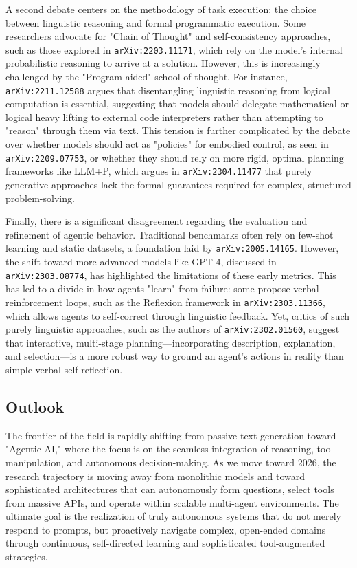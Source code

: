 \documentclass[11pt]{article}
\begin{document}
A second debate centers on the methodology of task execution: the choice between linguistic reasoning and formal programmatic execution. Some researchers advocate for "Chain of Thought" and self-consistency approaches, such as those explored in \texttt{arXiv:2203.11171}, which rely on the model's internal probabilistic reasoning to arrive at a solution. However, this is increasingly challenged by the "Program-aided" school of thought. For instance, \texttt{arXiv:2211.12588} argues that disentangling linguistic reasoning from logical computation is essential, suggesting that models should delegate mathematical or logical heavy lifting to external code interpreters rather than attempting to "reason" through them via text. This tension is further complicated by the debate over whether models should act as "policies" for embodied control, as seen in \texttt{arXiv:2209.07753}, or whether they should rely on more rigid, optimal planning frameworks like LLM+P, which argues in \texttt{arXiv:2304.11477} that purely generative approaches lack the formal guarantees required for complex, structured problem-solving.

Finally, there is a significant disagreement regarding the evaluation and refinement of agentic behavior. Traditional benchmarks often rely on few-shot learning and static datasets, a foundation laid by \texttt{arXiv:2005.14165}. However, the shift toward more advanced models like GPT-4, discussed in \texttt{arXiv:2303.08774}, has highlighted the limitations of these early metrics. This has led to a divide in how agents "learn" from failure: some propose verbal reinforcement loops, such as the Reflexion framework in \texttt{arXiv:2303.11366}, which allows agents to self-correct through linguistic feedback. Yet, critics of such purely linguistic approaches, such as the authors of \texttt{arXiv:2302.01560}, suggest that interactive, multi-stage planning—incorporating description, explanation, and selection—is a more robust way to ground an agent's actions in reality than simple verbal self-reflection.

\subsection{Outlook}

The frontier of the field is rapidly shifting from passive text generation toward "Agentic AI," where the focus is on the seamless integration of reasoning, tool manipulation, and autonomous decision-making. As we move toward 2026, the research trajectory is moving away from monolithic models and toward sophisticated architectures that can autonomously form questions, select tools from massive APIs, and operate within scalable multi-agent environments. The ultimate goal is the realization of truly autonomous systems that do not merely respond to prompts, but proactively navigate complex, open-ended domains through continuous, self-directed learning and sophisticated tool-augmented strategies.
\end{document}

